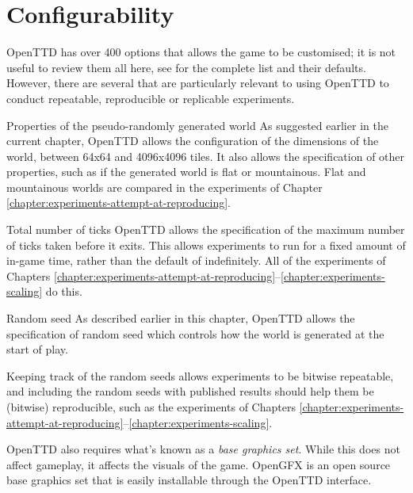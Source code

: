 \documentclass[logo,msc,dsti]{style/infthesis}    %
\begin{document}
{\section{Configurability}

OpenTTD has over 400 options that allows the game to be customised; it is not useful to review them all here, see \cite{OpenTTDWiki} for the complete list and their defaults. However, there are several that are particularly relevant to using OpenTTD to conduct repeatable, reproducible or replicable experiments.

\begin{itemize}
\begin{descitem}{Properties of the pseudo-randomly generated world}
As suggested earlier in the current chapter, OpenTTD allows the configuration of the dimensions of the world, between  64x64 and 4096x4096 tiles. It also allows the specification of other properties, such as if the generated world is flat or mountainous. Flat and mountainous worlds are compared in the experiments of Chapter \ref{chapter:experiments-attempt-at-reproducing}.
\end{descitem}
\begin{descitem}{Total number of ticks}
OpenTTD allows the specification of the maximum number of ticks taken before it exits. This allows experiments to run for a fixed amount of in-game time, rather than the default of indefinitely. All of the experiments of Chapters \ref{chapter:experiments-attempt-at-reproducing}--\ref{chapter:experiments-scaling} do this.
\end{descitem}
\begin{descitem}{Random seed}
As described earlier in this chapter, OpenTTD allows the specification of random seed which controls how the world is generated at the start of play.

Keeping track of the random seeds allows experiments to be bitwise repeatable, and including the random seeds with published results should help them be (bitwise) reproducible, such as the experiments of Chapters \ref{chapter:experiments-attempt-at-reproducing}--\ref{chapter:experiments-scaling}.
\end{descitem}

\end{itemize}

OpenTTD also requires what's known as a \emph{base graphics set}. While this does not affect gameplay, it affects the visuals of the game. OpenGFX \cite{OpenGFXSource} is an open source base graphics set that is easily installable through the OpenTTD interface.

}
\end{document}
